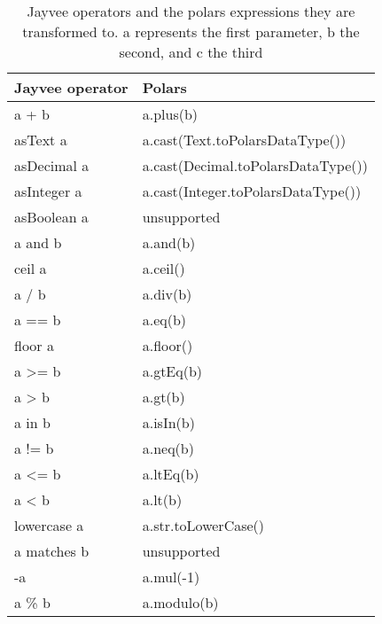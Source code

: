 \begin{table}
	\caption{Jayvee operators and the polars expressions they are transformed to.
		a represents the first parameter, b the second, and c the third}
	\label{tab:impl:expressions}
	\begin{tabular}{|l|l|}
		\hline
		Jayvee operator    & Polars                             \\
		\hline
		\hline
		a + b              & a.plus(b)                          \\
		\hline
		asText a           & a.cast(Text.toPolarsDataType())    \\
		\hline
		asDecimal a        & a.cast(Decimal.toPolarsDataType()) \\
		\hline
		asInteger a        & a.cast(Integer.toPolarsDataType()) \\
		\hline
		asBoolean a        & unsupported                        \\
		\hline
		a and b            & a.and(b)                           \\
		\hline
		ceil a             & a.ceil()                           \\
		\hline
		a / b              & a.div(b)                           \\
		\hline
		a == b             & a.eq(b)                            \\
		\hline
		floor a            & a.floor()                          \\
		\hline
		a >= b             & a.gtEq(b)                          \\
		\hline
		a > b              & a.gt(b)                            \\
		\hline
		a in b             & a.isIn(b)                          \\
		\hline
		a != b             & a.neq(b)                           \\
		\hline
		a <= b             & a.ltEq(b)                          \\
		\hline
		a < b              & a.lt(b)                            \\
		\hline
		lowercase a        & a.str.toLowerCase()                \\
		\hline
		a matches b        & unsupported                        \\
		\hline
		-a                 & a.mul(-1)                          \\
		\hline
		a \% b             & a.modulo(b)                        \\

\end{tabular}
\end{table}
